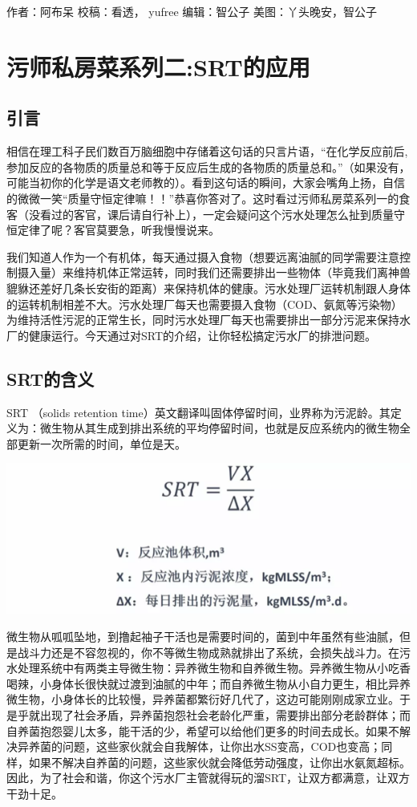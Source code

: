\documentclass[]{book}
\begin{document}
作者：阿布呆 校稿：看透， yufree 编辑：智公子 美图：丫头晚安，智公子

\section{污师私房菜系列二:SRT的应用}\label{srt}

\subsection{引言}

相信在理工科子民们数百万脑细胞中存储着这句话的只言片语，``在化学反应前后,参加反应的各物质的质量总和等于反应后生成的各物质的质量总和。''（如果没有，可能当初你的化学是语文老师教的）。看到这句话的瞬间，大家会嘴角上扬，自信的微微一笑``质量守恒定律嘛！！''恭喜你答对了。这时看过污师私房菜系列一的食客（没看过的客官，课后请自行补上），一定会疑问这个污水处理怎么扯到质量守恒定律了呢？客官莫要急，听我慢慢说来。

我们知道人作为一个有机体，每天通过摄入食物（想要远离油腻的同学需要注意控制摄入量）来维持机体正常运转，同时我们还需要排出一些物体（毕竟我们离神兽貔貅还差好几条长安街的距离）来保持机体的健康。污水处理厂运转机制跟人身体的运转机制相差不大。污水处理厂每天也需要摄入食物（COD、氨氮等污染物）为维持活性污泥的正常生长，同时污水处理厂每天也需要排出一部分污泥来保持水厂的健康运行。今天通过对SRT的介绍，让你轻松搞定污水厂的排泄问题。

\subsection{SRT的含义}\label{srt}

SRT （solids retention
time）英文翻译叫固体停留时间，业界称为污泥龄。其定义为：微生物从其生成到排出系统的平均停留时间，也就是反应系统内的微生物全部更新一次所需的时间，单位是天。

\includegraphics[width=8.33in]{images/srt1}

微生物从呱呱坠地，到撸起袖子干活也是需要时间的，菌到中年虽然有些油腻，但是战斗力还是不容忽视的，你不等微生物成熟就排出了系统，会损失战斗力。在污水处理系统中有两类主导微生物：异养微生物和自养微生物。异养微生物从小吃香喝辣，小身体长很快就过渡到油腻的中年；而自养微生物从小自力更生，相比异养微生物，小身体长的比较慢，异养菌都繁衍好几代了，这边可能刚刚成家立业。于是乎就出现了社会矛盾，异养菌抱怨社会老龄化严重，需要排出部分老龄群体；而自养菌抱怨婴儿太多，能干活的少，希望可以给他们更多的时间去成长。如果不解决异养菌的问题，这些家伙就会自我解体，让你出水SS变高，COD也变高；同样，如果不解决自养菌的问题，这些家伙就会降低劳动强度，让你出水氨氮超标。因此，为了社会和谐，你这个污水厂主管就得玩的溜SRT，让双方都满意，让双方干劲十足。
\end{document}
